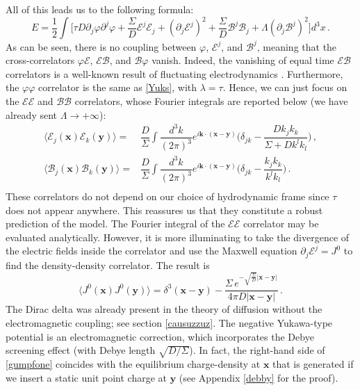 \documentclass[a4paper, amsfonts, amssymb, amsmath, reprint, showkeys, nofootinbib, twoside,notitlepage,onecolumn,preprintnumbers]{revtex4-2}
\theoremstyle{definition}
\theoremstyle{theorem}
\theoremstyle{corollary}
\begin{document}
All of this leads us to the following formula:
\begin{equation}
    E = \dfrac{1}{2} \int \bigg[  \tau D \partial_j \varphi \partial^j \varphi +\dfrac{\Sigma}{D} \mathcal{E}^j \mathcal{E}_j +(\partial_j \mathcal{E}^j)^2 +\dfrac{\Sigma}{D} \mathcal{B}^j \mathcal{B}_j + \Lambda (\partial_j \mathcal{B}^j)^2 \bigg] d^3 x \, .
\end{equation}
As can be seen, there is no coupling between $\varphi$, $\mathcal{E}^j$, and $\mathcal{B}^j$, meaning that the cross-correlators $\varphi \mathcal{E}$, $\mathcal{E}\mathcal{B}$, and $\mathcal{B}\varphi$ vanish. Indeed, the vanishing of equal time $\mathcal{E}\mathcal{B}$ correlators is a well-known result of fluctuating electrodynamics \cite{landau9}. Furthermore, the $\varphi\varphi$ correlator is the same as \eqref{Yuks}, with $\lambda=\tau$. Hence, we can just focus on the $\mathcal{E}\mathcal{E}$ and $\mathcal{B}\mathcal{B}$ correlators, whose Fourier integrals are reported below (we have already sent $\Lambda \rightarrow +\infty$):
\begin{equation}
    \begin{split}
\langle \mathcal{E}_j(\textbf{x})\mathcal{E}_k(\textbf{y}) \rangle ={}& \dfrac{D}{\Sigma} \int \dfrac{d^3 k}{(2\pi)^3} e^{i\textbf{k}\cdot (\textbf{x}-\textbf{y})}  \bigg( \delta_{jk} - \dfrac{D k_j k_k}{\Sigma + Dk^l k_l} \bigg) \, , \\
\langle \mathcal{B}_j(\textbf{x})\mathcal{B}_k(\textbf{y}) \rangle ={}& \dfrac{D}{\Sigma} \int \dfrac{d^3 k}{(2\pi)^3} e^{i\textbf{k}\cdot (\textbf{x}-\textbf{y})}  \bigg( \delta_{jk} - \dfrac{k_j k_k}{k^l k_l} \bigg)\, . \\
    \end{split}
\end{equation}
These correlators do not depend on our choice of hydrodynamic frame since $\tau$ does not appear anywhere. This reassures us that they constitute a robust prediction of the model. The Fourier integral of the $\mathcal{E}\mathcal{E}$ correlator may be evaluated analytically. However, it is more illuminating to take the divergence of the electric fields inside the correlator and use the Maxwell equation $\partial_j \mathcal{E}^j=J^0$ to find the density-density correlator. The result is
\begin{equation}\label{gumpfone}
    \langle J^0(\textbf{x})  J^0(\textbf{y}) \rangle= \delta^3(\textbf{x}{-}\textbf{y}) -\dfrac{\Sigma \, e^{-\sqrt{\frac{\Sigma}{D}} |\textbf{x}-\textbf{y}|}}{4\pi D |\textbf{x}-\textbf{y}|} \, .
\end{equation}
The Dirac delta was already present in the theory of diffusion without the electromagnetic coupling; see section \ref{causuzzuz}. The negative Yukawa-type potential is an electromagnetic correction, which incorporates the Debye screening effect (with Debye length $\sqrt{D/\Sigma}$). In fact, the right-hand side of \eqref{gumpfone} coincides with the equilibrium charge-density at $\textbf{x}$ that is generated if we insert a static unit point charge at $\textbf{y}$ (see Appendix \ref{debby} for the proof). 
\end{document}
